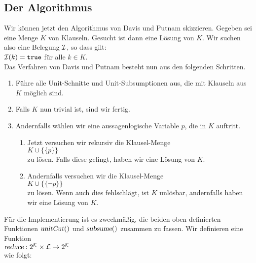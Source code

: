 \subsection{Der Algorithmus}
Wir k\"{o}nnen jetzt den Algorithmus von Davis und Putnam skizzieren.
Gegeben sei eine Menge $K$ von Klauseln.  Gesucht ist dann eine L\"{o}sung von $K$.  Wir
suchen  also eine Belegung $\mathcal{I}$, so dass gilt: \\[0.2cm]
\hspace*{1.3cm} $\mathcal{I}(k) = \mathtt{true}$ \quad f\"{u}r alle $k \in K$.\\[0.2cm]
Das Verfahren von Davis und Putnam besteht nun aus den folgenden Schritten.
\begin{enumerate}
\item F\"{u}hre alle Unit-Schnitte und Unit-Subsumptionen aus, die mit Klauseln aus $K$ m\"{o}glich sind.
\item Falls $K$ nun trivial ist, sind wir fertig.
\item Andernfalls w\"{a}hlen wir eine aussagenlogische Variable $p$, die in $K$ auftritt.
      \begin{enumerate}
      \item Jetzt versuchen  wir rekursiv  die Klausel-Menge \\[0.2cm]
            \hspace*{1.3cm}  $K \cup \bigl\{\{p\}\bigr\}$ \\[0.2cm]
            zu l\"{o}sen. Falls diese gelingt, haben wir eine L\"{o}sung von $K$.
      \item Andernfalls versuchen wir  die Klausel-Menge \\[0.2cm]
            \hspace*{1.3cm} $K \cup \bigl\{\{\neg p\}\bigr\}$ \\[0.2cm]
            zu l\"{o}sen.  Wenn auch dies fehlschl\"{a}gt, ist $K$ unl\"{o}sbar, andernfalls
            haben wir eine L\"{o}sung von $K$.
      \end{enumerate}
\end{enumerate}
F\"{u}r die Implementierung ist es zweckm\"{a}\ss{}ig, die beiden oben definierten Funktionen $\textsl{unitCut}()$ und
$\textsl{subsume}()$ zusammen zu fassen.  Wir definieren eine Funktion
\\[0.2cm]
\hspace*{1.3cm}
$\textsl{reduce}: 2^\mathcal{K} \times \mathcal{L} \rightarrow 2^\mathcal{K}$
\\[0.2cm]
wie folgt: 
\\[0.2cm]
\hspace*{1.3cm}
